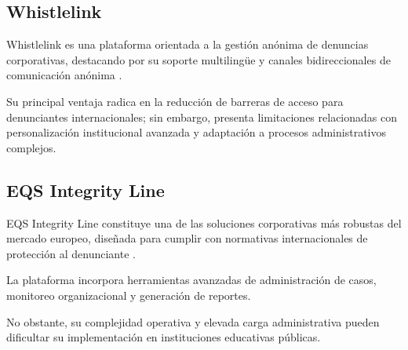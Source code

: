 
\subsection{Whistlelink}

\begin{flushleft}
\justifying

Whistlelink es una plataforma orientada a la gestión anónima de denuncias corporativas, destacando por su soporte multilingüe y canales bidireccionales de comunicación anónima \cite{15}.

Su principal ventaja radica en la reducción de barreras de acceso para denunciantes internacionales; sin embargo, presenta limitaciones relacionadas con personalización institucional avanzada y adaptación a procesos administrativos complejos.

\end{flushleft}


\subsection{EQS Integrity Line}

\begin{flushleft}
\justifying

EQS Integrity Line constituye una de las soluciones corporativas más robustas del mercado europeo, diseñada para cumplir con normativas internacionales de protección al denunciante \cite{16}.

La plataforma incorpora herramientas avanzadas de administración de casos, monitoreo organizacional y generación de reportes.

No obstante, su complejidad operativa y elevada carga administrativa pueden dificultar su implementación en instituciones educativas públicas.

\end{flushleft}



